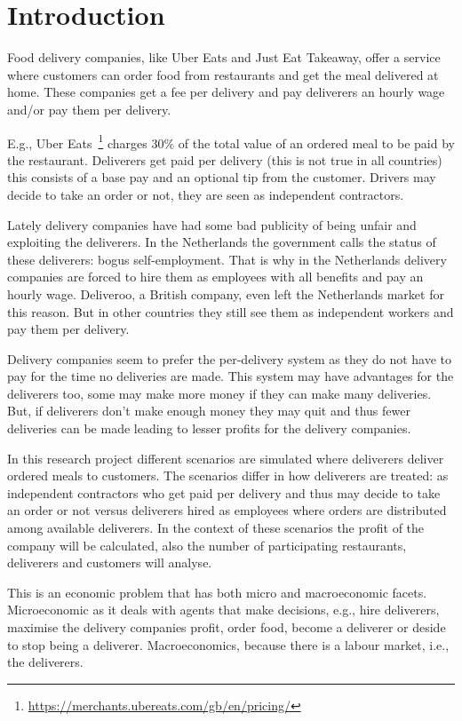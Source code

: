 
\section{Introduction}

Food delivery companies, like Uber Eats and Just Eat Takeaway, offer a service where customers can order food from restaurants and get the meal delivered at home.
These companies get a fee per delivery and pay deliverers an hourly wage and/or pay them per delivery.

E.g., Uber Eats~\footnote{\url{https://merchants.ubereats.com/gb/en/pricing/}} charges 30\% of the total value of an ordered meal to be paid by the restaurant.
Deliverers get paid per delivery (this is not true in all countries) this consists of a base pay and an optional tip from the customer.
Drivers may decide to take an order or not, they are seen as independent contractors.

Lately delivery companies have had some bad publicity of being unfair and exploiting the deliverers.
In the Netherlands the government calls the status of these deliverers: bogus self-employment.
That is why in the Netherlands delivery companies are forced to hire them as employees with all benefits and pay an hourly wage.
Deliveroo, a British company, even left the Netherlands market for this reason.
But in other countries they still see them as independent workers and pay them per delivery.

Delivery companies seem to prefer the per-delivery system as they do not have to pay for the time no deliveries are made.
This system may have advantages for the deliverers too, some may make more money if they can make many deliveries.
But, if deliverers don't make enough money they may quit and thus fewer deliveries can be made leading to lesser profits for the delivery companies.

In this research project different scenarios are simulated where deliverers deliver ordered meals to customers.
The scenarios differ in how deliverers are treated: as independent contractors who get paid per delivery and thus may decide to take an order or not versus
deliverers hired as employees where orders are distributed among available deliverers.
In the context of these scenarios the profit of the company will be calculated, also the number of participating restaurants, deliverers and customers will analyse.

This is an economic problem that has both micro and macroeconomic facets.
Microeconomic as it deals with agents that make decisions, e.g., hire deliverers, maximise the delivery companies profit, order food, become a deliverer or deside to stop being a deliverer.
Macroeconomics, because there is a labour market, i.e., the deliverers.

